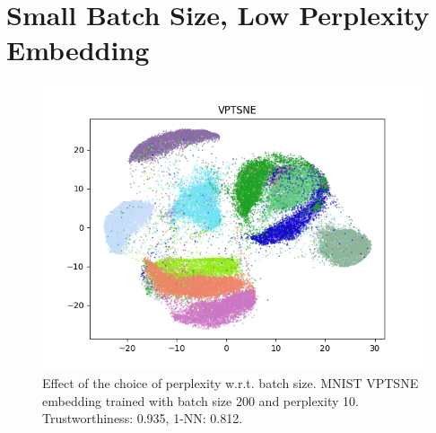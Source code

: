 \appendix
\chapter{Small Batch Size, Low Perplexity Embedding}
\label{appendix:low_perp_small_bs}
\begin{figure}[!htb]
  \centering
  \includegraphics[width=\textwidth]{images/mnist_vptsne_bs_200_perp_10.png} 
  \caption{Effect of the choice of perplexity w.r.t. batch size. MNIST VPTSNE embedding trained with batch size 200 and perplexity 10. Trustworthiness: 0.935, 1-NN: 0.812.}
  \label{fig:low_perp_small_bs}
\end{figure}

